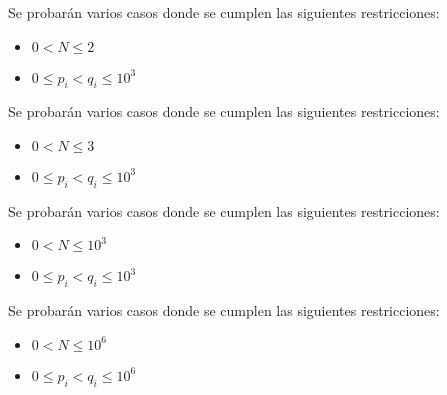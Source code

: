 \documentclass{oci}
\begin{document}
\begin{scoreDescription}
    Se probarán varios casos donde se cumplen las siguientes restricciones:
    \begin{itemize}
    \item $0 < N \leq 2$
    \item $0 \leq p_i< q_i \leq 10^3$
    \end{itemize}
  \newpage
    Se probarán varios casos donde se cumplen las siguientes restricciones:
    \begin{itemize}
    \item $0 < N \leq 3$
    \item $0 \leq p_i< q_i \leq 10^3$
    \end{itemize}
    Se probarán varios casos donde se cumplen las siguientes restricciones:
    \begin{itemize}
    \item $0 < N \leq 10^3$
    \item $0 \leq p_i< q_i \leq 10^3$
    \end{itemize}
    Se probarán varios casos donde se cumplen las siguientes restricciones:
    \begin{itemize}
    \item $0 < N \leq 10^6$
    \item $0 \leq p_i< q_i \leq 10^6$
    \end{itemize}
\end{scoreDescription}

\begin{sampleDescription}
\end{sampleDescription}
\end{document}
